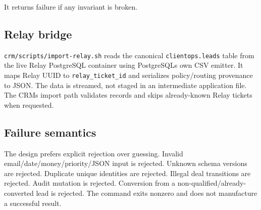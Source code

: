 \documentclass[
]{article}
\begin{document}
It returns failure if any invariant is broken.

\subsection{Relay bridge}\label{relay-bridge}

\texttt{crm/scripts/import-relay.sh} reads the canonical
\texttt{clientops.leads} table from the live Relay PostgreSQL container
using PostgreSQL\textquotesingle s own CSV emitter. It maps Relay UUID
to \texttt{relay\_ticket\_id} and serializes policy/routing provenance
to JSON. The data is streamed, not staged in an intermediate application
file. The CRM\textquotesingle s import path validates records and skips
already-known Relay tickets when requested.

\subsection{Failure semantics}\label{failure-semantics}

The design prefers explicit rejection over guessing. Invalid
email/date/money/priority/JSON input is rejected. Unknown schema
versions are rejected. Duplicate unique identities are rejected. Illegal
deal transitions are rejected. Audit mutation is rejected. Conversion
from a non-qualified/already-converted lead is rejected. The command
exits nonzero and does not manufacture a successful result.
\end{document}
